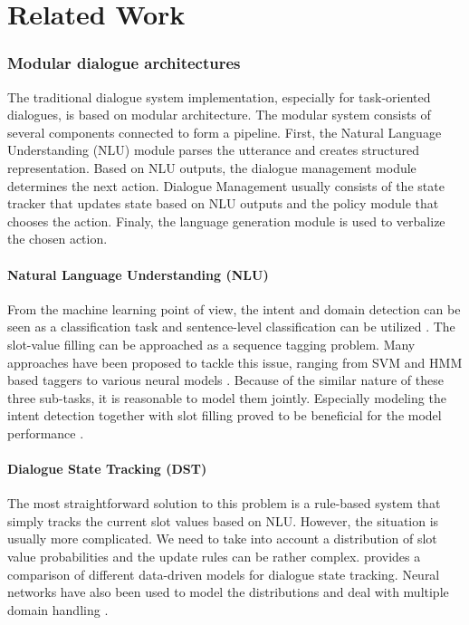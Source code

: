 \chapter{Related Work}%
\label{chap:related}
\label{sec:relwork}

\subsection{Modular dialogue architectures}
\label{sec:relwork-modular}
The traditional dialogue system implementation, especially for task-oriented dialogues, is based on modular architecture.
The modular system consists of several components connected to form a pipeline.
First, the Natural Language Understanding (NLU) module parses the utterance and creates structured representation.
Based on NLU outputs, the dialogue management module determines the next action.
Dialogue Management usually consists of the state tracker that updates state based on NLU outputs and the policy module that chooses the action.
Finaly, the language generation module is used to verbalize the chosen action.
\subsubsection{Natural Language Understanding (NLU)}
From the machine learning point of view, the intent and domain detection can be seen as a classification task and sentence-level classification can be utilized \cite{yaman2008integrative,schapire2000boostexter}.
The slot-value filling can be approached as a sequence tagging problem.
Many approaches have been proposed to tackle this issue, ranging from SVM \cite{shi2016recurrent} and HMM \cite{surendran2006dialog} based taggers to various neural models \cite{adel2016comparing, zhang2017position, mesnil2014using}.
Because of the similar nature of these three sub-tasks, it is reasonable to model them jointly.
Especially modeling the intent detection together with slot filling proved to be beneficial for the model performance \cite{zhang2017position, liu2016attention, xu2013convolutional}.
\subsubsection{Dialogue State Tracking (DST)} 
The most straightforward solution to this problem is a rule-based system that simply tracks the current slot values based on NLU.
However, the situation is usually more complicated.
We need to take into account a distribution of slot value probabilities and the update rules can be rather complex.
\citet{vzilka2013comparison} provides a comparison of different data-driven models for dialogue state tracking.
Neural networks have also been used to model the distributions \cite{mrkvsic2016neural, zhong2018global} and deal with multiple domain handling \cite{rastogi2017scalable}.

